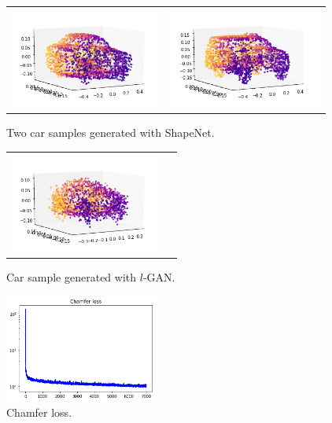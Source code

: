 \documentclass[12pt]{article}
\begin{document}
    \begin{figure}
        \centering
        \begin{tabular}{cc}
            \includegraphics[width = 50mm]{car-shapenet-1} &
            \includegraphics[width = 50mm]{car-shapenet-2} \\
        \end{tabular}
        \caption{Two car samples generated with ShapeNet.}
    \end{figure}


    \begin{figure}
        \centering
        \begin{tabular}{cc}
            \includegraphics[width = 50mm]{car-lgan}
        \end{tabular}
        \caption{Car sample generated with $l$-GAN.}
    \end{figure}


    \begin{figure}
        \centering
        \includegraphics[width = 50mm]{chamfer-loss}
        \caption{Chamfer loss.}
    \end{figure}
\end{document}

